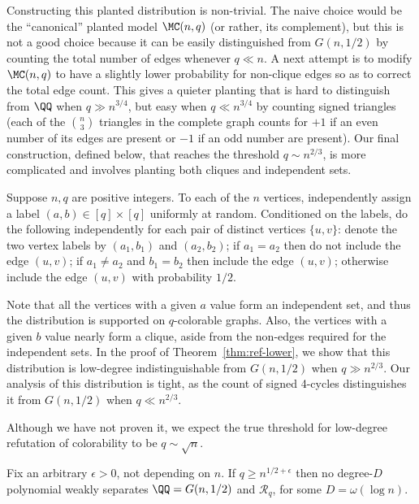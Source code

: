 \documentclass{article}
\begin{document}
Constructing this planted distribution is non-trivial. The naive choice would be the ``canonical'' planted model $\MC(n,q)$ (or rather, its complement), but this is not a good choice because it can be easily distinguished from $G(n,1/2)$ by counting the total number of edges whenever $q \ll n$. A next attempt is to modify $\MC(n,q)$ to have a slightly lower probability for non-clique edges so as to correct the total edge count. This gives a quieter planting that is hard to distinguish from $\QQ$ when $q \gg n^{3/4}$, but easy when $q \ll n^{3/4}$ by counting signed triangles (each of the $\binom{n}{3}$ triangles in the complete graph counts for $+1$ if an even number of its edges are present or $-1$ if an odd number are present). Our final construction, defined below, that reaches the threshold $q \sim n^{2/3}$, is more complicated and involves planting both cliques and independent sets.


\begin{definition}
\label{def:planting}
Suppose $n,q$ are positive integers. To each of the $n$ vertices, independently assign a label $(a,b) \in [q] \times [q]$ uniformly at random. Conditioned on the labels, do the following independently for each pair of distinct vertices $\{u,v\}$: denote the two vertex labels by $(a_1,b_1)$ and $(a_2,b_2)$; if $a_1 = a_2$ then do not include the edge $(u,v)$; if $a_1 \ne a_2$ and $b_1 = b_2$ then include the edge $(u,v)$; otherwise include the edge $(u,v)$ with probability $1/2$.
\end{definition}

\noindent Note that all the vertices with a given $a$ value form an independent set, and thus the distribution is supported on $q$-colorable graphs. Also, the vertices with a given $b$ value nearly form a clique, aside from the non-edges required for the independent sets. In the proof of Theorem~\ref{thm:ref-lower}, we show that this distribution is low-degree indistinguishable from $G(n,1/2)$ when $q \gg n^{2/3}$. Our analysis of this distribution is tight, as the count of signed 4-cycles distinguishes it from $G(n,1/2)$ when $q \ll n^{2/3}$.

Although we have not proven it, we expect the true threshold for low-degree refutation of colorability to be $q \sim \sqrt{n}$.

\begin{conjecture}\label{conj:quiet}
Fix an arbitrary $\epsilon > 0$, not depending on $n$. If $q \ge n^{1/2 + \epsilon}$ then no degree-$D$ polynomial weakly separates $\QQ = G(n,1/2)$ and $\mathcal{R}_q$, for some $D = \omega(\log n)$.
\end{conjecture}
\end{document}
